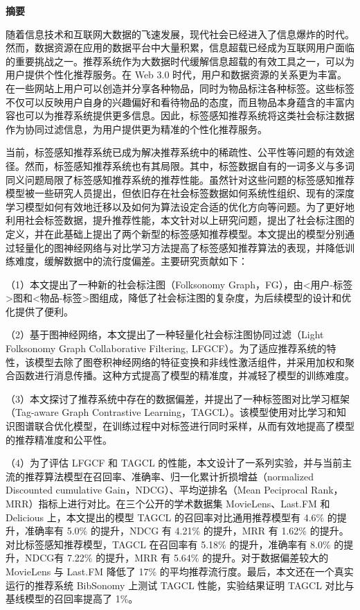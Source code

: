 \clearpage
{}
\begin{center}
    \textbf{  \heiti 摘\quad 要}
\end{center}
\songti {}

随着信息技术和互联网大数据的飞速发展，现代社会已经进入了信息爆炸的时代。然而，数据资源在应用的数据平台中大量积累，信息超载已经成为互联网用户面临的重要挑战之一。推荐系统作为大数据时代缓解信息超载的有效工具之一，可以为用户提供个性化推荐服务。在 Web 3.0 时代，用户和数据资源的关系更为丰富。在一些网站上用户可以创造并分享各种物品，同时为物品标注各种标签。这些标签不仅可以反映用户自身的兴趣偏好和看待物品的态度，而且物品本身蕴含的丰富内容也可以为推荐系统提供更多信息。因此，标签感知推荐系统将这类社会标注数据作为协同过滤信息，为用户提供更为精准的个性化推荐服务。

当前，标签感知推荐系统已成为解决推荐系统中的稀疏性、公平性等问题的有效途径。然而，标签感知推荐系统也有其局限。其中，标签数据自有的一词多义与多词同义问题局限了标签感知推荐系统的推荐性能。虽然针对这些问题的标签感知推荐模型被一些研究人员提出，但依旧存在社会标签数据如何系统性组织、现有的深度学习模型如何有效地迁移以及如何为算法设定合适的优化方向等问题。为了更好地利用社会标签数据，提升推荐性能，本文针对以上研究问题，提出了社会标注图的定义，并在此基础上提出了两个新型的标签感知推荐模型。本文提出的模型分别通过轻量化的图神经网络与对比学习方法提高了标签感知推荐算法的表现，并降低训练难度，缓解数据中的流行度偏差。主要研究贡献如下：

（1）本文提出了一种新的社会标注图（Folksonomy Graph，FG），由<用户-标签>图和<物品-标签>图组成，降低了社会标注图的复杂度，为后续模型的设计和优化提供了便利。

（2）基于图神经网络，本文提出了一种轻量化社会标注图协同过滤（Light Folksonomy Graph Collaborative Filtering, LFGCF）。为了适应推荐系统的特性，该模型去除了图卷积神经网络的特征变换和非线性激活组件，并采用加权和聚合函数进行消息传播。这种方式提高了模型的精准度，并减轻了模型的训练难度。

（3）本文探讨了推荐系统中存在的数据偏差，并提出了一种标签图对比学习框架（Tag-aware Graph Contrastive Learning，TAGCL）。该模型使用对比学习和知识图谱联合优化模型，在训练过程中对标签进行同时采样，从而有效地提高了模型的推荐精准度和公平性。

（4）为了评估 LFGCF 和 TAGCL 的性能，本文设计了一系列实验，并与当前主流的推荐算法模型在召回率、准确率、归一化累计折损增益（normalized Discounted cumulative Gain，NDCG）、平均逆排名（Mean Peciprocal Rank，MRR）指标上进行对比。在三个公开的学术数据集 MovieLens、Last.FM 和 Delicious 上，本文提出的模型 TAGCL 的召回率对比通用推荐模型有 4.6\% 的提升，准确率有 5.0\% 的提升，NDCG 有 4.21\% 的提升，MRR 有 1.62\% 的提升。对比标签感知推荐模型，TAGCL 在召回率有 5.18\% 的提升，准确率有 8.0\% 的提升，NDCG有 7.22\% 的提升，MRR 有 5.64\% 的提升。对于数据偏差较大的 MovieLens 与 Last.FM 降低了 17\% 的平均推荐流行度。最后，本文还在一个真实运行的推荐系统 BibSonomy 上测试 TAGCL 性能，实验结果证明 TAGCL 对比与基线模型的召回率提高了 1\%。


